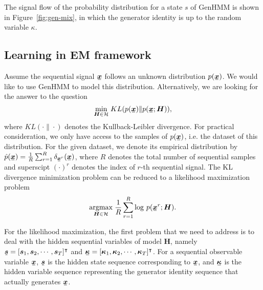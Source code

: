 \documentclass{ecai}
\newcommand{\ubar}[1]{\mkern2mu\underline{\mkern-2mu #1\mkern-2mu}\mkern2mu}
\newcommand{\ubm}[1]{\ubar{\bm{#1}}}
\newcommand{\ubmr}[2]{\ubar{\bm{#1}}^{#2}}
\begin{document}
The signal flow of the probability distribution for a state $s$ of GenHMM is shown in Figure~\ref{fig:gen-mix}, in which the generator identity is up to the random variable $\kappa$.

\subsection{Learning in EM framework}

Assume the sequential signal $\ubm{x}$ follows an unknown distribution $p(\ubm{x})$. We would like to use GenHMM to model this distribution. Alternatively, we are looking for the answer to the question
\begin{equation}
  \umin{\bm{H}\in \Hh} KL({p}(\ubm{x})\| p(\ubm{x};\bm{H})),
\end{equation}
where $KL(\cdot\|\cdot)$ denotes the Kullback-Leibler divergence. For practical consideration, we only have access to the samples of $p(\ubm{x})$, i.e. the dataset of this distribution. For the given dataset, we denote its empirical distribution by $\hat{p}(\ubm{x}) = \frac{1}{R}\sum_{r=1}^{R} \delta_{\ubmr{x}{r}}(\ubm{x})$, where $R$ denotes the total number of sequential samples and superscipt $(\cdot)^{r}$ denotes the index of $r$-th sequential signal. 
The KL divergence minimization problem can be reduced to a likelihood maximization problem
\begin{equation}\label{eq:ml-of-hmm}
  \uargmax{\bm{H} \in \Hh} \frac{1}{R}\sum_{r=1}^{R}\log\,p(\ubmr{x}{r}; \bm{H}).
\end{equation}

For the likelihood maximization, the first problem that we need to address is to deal with the hidden sequential variables of model $\bm{H}$, namely $\ubm{s}=[ \bm{s}_1, \bm{s}_2, \cdots, \bm{s}_T ]^{\intercal}$ and $\ubm{\kappa} = [\bm{\kappa}_1, \bm{\kappa}_2, \cdots, \bm{\kappa}_T]^{\intercal}$. For a sequential observable variable $\ubm{x}$, $\ubm{s}$ is the hidden state sequence corresponding to $\ubm{x}$, and $\ubm{\kappa}$ is the hidden variable sequence representing the generator identity sequence that actually generates $\ubm{x}$.
\end{document}

